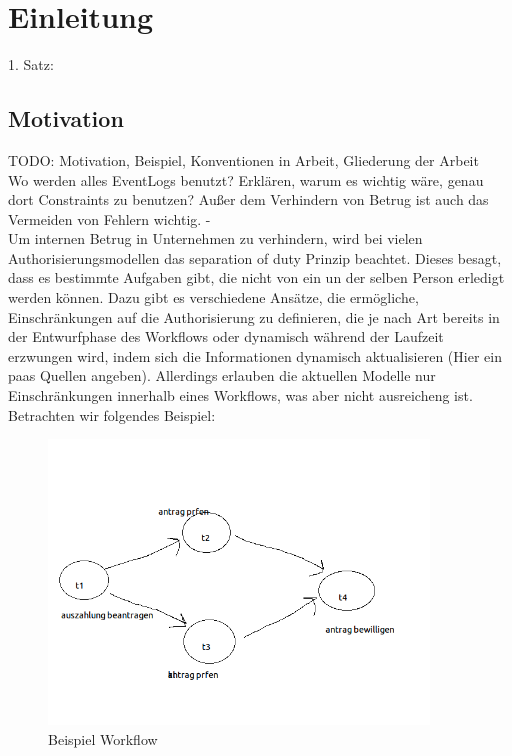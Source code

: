 
\chapter{Einleitung} %

\label{Chapter1} %


1. Satz:\\


\section{Motivation}
TODO: Motivation, Beispiel, Konventionen in Arbeit, Gliederung der Arbeit\\
Wo werden alles EventLogs benutzt? Erklären, warum es wichtig wäre, genau dort Constraints zu benutzen? Außer dem Verhindern von Betrug ist auch das Vermeiden von Fehlern wichtig. -\\
Um internen Betrug in Unternehmen zu verhindern, wird bei vielen Authorisierungsmodellen das separation of duty Prinzip beachtet. Dieses besagt, dass es bestimmte Aufgaben gibt, die nicht von ein un der selben Person erledigt werden können. Dazu gibt es verschiedene Ansätze, die ermögliche, Einschränkungen auf die Authorisierung zu definieren, die je nach Art bereits in der Entwurfphase des Workflows oder dynamisch während der Laufzeit erzwungen wird, indem sich die Informationen dynamisch aktualisieren (Hier ein paas Quellen angeben). Allerdings erlauben die aktuellen Modelle nur Einschränkungen innerhalb eines Workflows, was aber nicht ausreicheng ist.\\
Betrachten wir folgendes Beispiel:\\

\begin{figure}[ht]
	\centering
  \includegraphics[width=0.9\textwidth]{"Figures/Workflow"}
	\caption{Beispiel Workflow}
	\label{fig: exampleworkflow}
\end{figure}

